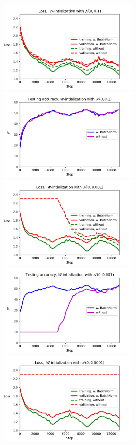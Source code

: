 \documentclass{article}
\begin{document}
	\begin{figure}[h!]
		\centering
		\includegraphics[width=7cm]{../plots/loss_comp_sigma1.png}
		\includegraphics[width=7cm]{../plots/acc_comp_sigma1.png}
		\includegraphics[width=7cm]{../plots/loss_comp_sigma2.png}
		\includegraphics[width=7cm]{../plots/acc_comp_sigma2.png}
		\includegraphics[width=7cm]{../plots/loss_comp_sigma3.png}

\end{figure}
\end{document}
